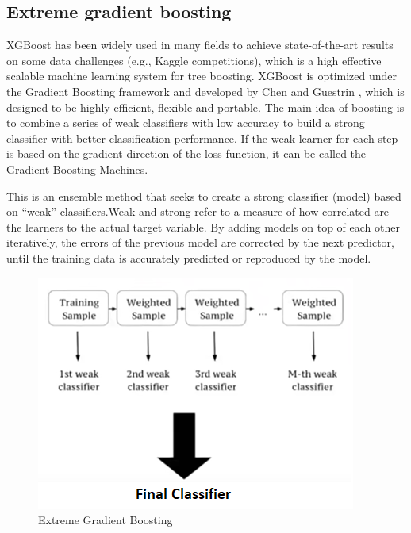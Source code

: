 \subsection{Extreme gradient boosting}
XGBoost has been widely used in many fields to achieve
state-of-the-art results on some data challenges (e.g., Kaggle
competitions), which is a high effective scalable machine
learning system for tree boosting. XGBoost is optimized under the Gradient Boosting framework and developed by Chen and Guestrin , which is designed to
be highly efficient, flexible and portable. The main idea
of boosting is to combine a series of weak classifiers
with low accuracy to build a strong classifier with better
classification performance. If the weak learner for each step
is based on the gradient direction of the loss function, it can
be called the Gradient Boosting Machines.
\par
 This is an ensemble method that seeks to create a strong classifier (model) based on “weak” classifiers.Weak and strong refer to a measure of how correlated are the learners to the actual target variable. By adding models on top of each other iteratively, the errors of the previous model are corrected by the next predictor, until the training data is accurately predicted or reproduced by the model.
\begin{figure}[h]
\label{ss}
\centering
\includegraphics[width= 10 cm]{xg.png}
\caption{ Extreme Gradient Boosting}
\end{figure}
